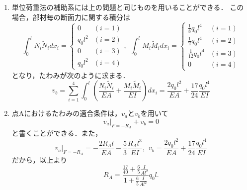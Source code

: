 \documentclass[10pt,a4j]{jarticle}
\begin{document}
\begin{enumerate}
\begin{equation}
\begin{array}{cc}
			\frac{Fl^3}{3} & (i=3) \\
			0 & (i=4)
		\end{array}
		\right.
	\end{equation}
	以上より，たわみが
	\begin{equation}
		v_a=
		\sum_{i=1}^4
		\int_0^l \left( \frac{N_i\tilde{N}_i}{EA} + \frac{M_i\tilde{M}_i}{EI} \right) dx_i
		=
		\frac{2Fl}{EA} + \frac{5}{3}\frac{Fl^3}{EI}
		\label{eqn:}
	\end{equation}
	と求められる．
\item
	単位荷重法の補助系には上の問題と同じものを用いることができる．
	この場合，部材毎の断面力に関する積分は
	\begin{equation}
		\int_0^l 
			N_i \tilde{N}_i dx_i = 
		\left\{
		\begin{array}{cc}
			0 & (i=1) \\
			q_0l^2& (i=2) \\
			0 & (i=3) \\
			q_0l^2 & (i=4)
		\end{array}
		\right.
		, \ \
		\int_0^l 
			M_i \tilde{M}_i dx_i = 
		\left\{
		\begin{array}{cc}
			\frac{1}{8}q_0l^4 & (i=1) \\
			\frac{1}{2}q_0l^4 & (i=2) \\
			\frac{1}{12}q_0l^4 & (i=3) \\
			0 & (i=4)
		\end{array}
		\right.
	\end{equation}
	となり，たわみが次のように求まる．
	\begin{equation}
		v_b=
		\sum_{i=1}^4
		\int_0^l \left( \frac{N_i\tilde{N}_i}{EA} + \frac{M_i\tilde{M}_i}{EI} \right) dx_i
		=
		\frac{2q_0l^2}{EA} + \frac{17}{24}\frac{q_0l^4}{EI}
		\label{eqn:}
	\end{equation}
\item
	点Aにおけるたわみの適合条件は，$v_a$と$v_b$を用いて
	\begin{equation}
		\left. v_a\right|_{F=-R_A}+ v_b=0
	\end{equation}
	と書くことができる．また，
	\begin{equation}
		\left. v_a\right|_{F=-R_A}= -\frac{2R_Al}{EA} - \frac{5}{3}\frac{R_Al^3}{EI}, \ \ 
		v_b= \frac{2q_0l^2}{EA} + \frac{17}{24}\frac{q_0l^4}{EI}
		\label{eqn:}
	\end{equation}
	だから，以上より
	\begin{equation}
		R_A=\frac
		{\frac{17}{40}+\frac{6}{5}\frac{I}{Al^2}}
		{1+\frac{6}{5}\frac{I}{Al^2}}q_0l.

\end{equation}
\end{enumerate}
\end{document}
